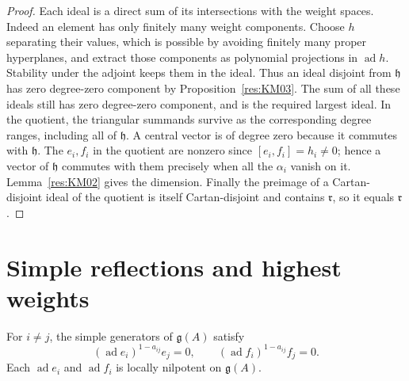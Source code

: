\begin{proof}
Each ideal is a direct sum of its intersections with the weight
spaces. Indeed an element has only finitely many weight components.
Choose \(h\) separating their values, which is possible by avoiding
finitely many proper hyperplanes, and extract those components
as polynomial projections in \(\operatorname{ad}h\). Stability
under the adjoint keeps them in the ideal. Thus an ideal disjoint
from \(\mathfrak h\) has zero degree-zero component by
Proposition~\ref{res:KM03}. The sum of all these ideals still has
zero degree-zero component, and is the required largest ideal.
In the quotient, the triangular summands survive as the corresponding
degree ranges, including all of \(\mathfrak h\). A central vector is
of degree zero because it commutes with \(\mathfrak h\).
The \(e_i,f_i\) in the quotient are nonzero since
\([e_i,f_i]=h_i\ne0\); hence a vector of \(\mathfrak h\) commutes
with them precisely when all the \(\alpha_i\) vanish on it.
Lemma~\ref{res:KM02} gives the dimension. Finally the preimage of a
Cartan-disjoint ideal of the quotient is itself Cartan-disjoint and
contains \(\mathfrak r\), so it equals \(\mathfrak r\).
\end{proof}

\section{Simple reflections and highest weights}

\begin{theorem}
\label{res:KM05}
For \(i\ne j\), the simple generators of \(\mathfrak g(A)\) satisfy
\[
 (\operatorname{ad}e_i)^{1-a_{ij}} e_j=0,\qquad
 (\operatorname{ad}f_i)^{1-a_{ij}} f_j=0 .
\]
Each \(\operatorname{ad}e_i\) and \(\operatorname{ad}f_i\) is locally
nilpotent on \(\mathfrak g(A)\).
\end{theorem}

